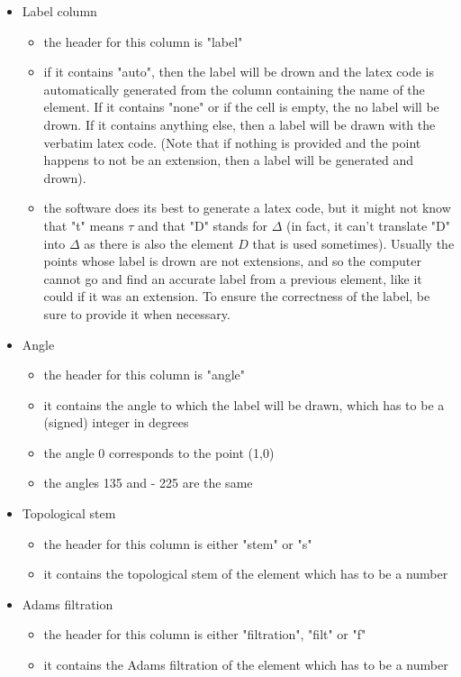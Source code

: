 \documentclass[a4paper,11pt]{article}
\begin{document}
\begin{itemize}
	\item{Label column}
	\begin{itemize}
		\item the header for this column is "label"
		\item if it contains "auto", then the label will be drown and the latex code is automatically generated from the column containing the name of the element. If it contains "none" or if the cell is empty, the no label will be drown. If it contains anything else, then a label will be drawn with the verbatim latex code. (Note that if nothing is provided and the point happens to not be an extension, then a label will be generated and drown).
		\item the software does its best to generate a latex code, but it might not know that "t" means $\tau$ and that "D" stands for $\Delta$ (in fact, it can't translate "D" into $\Delta$ as there is also the element $D$ that is used sometimes). Usually the points whose label is drown are not extensions, and so the computer cannot go and find an accurate label from a previous element, like it could if it was an extension. To ensure the correctness of the label, be sure to provide it when necessary. 
	\end{itemize}
	
	\item{Angle}
	\begin{itemize}
		\item the header for this column is "angle"
		\item it contains the angle to which the label will be drawn, which has to be a (signed) integer in degrees
		\item the angle 0 corresponds to the point (1,0)
		\item the angles 135 and - 225 are the same
	\end{itemize}
	
	\item{Topological stem}
	\begin{itemize}
		\item the header for this column is either "stem" or "s"
		\item it contains the topological stem of the element which has to be a number
	\end{itemize}
	
	\item{Adams filtration}
	\begin{itemize}
		\item the header for this column is either "filtration", "filt" or "f"
		\item it contains the Adams filtration of the element which has to be a number
	\end{itemize}
	

\end{itemize}
\end{document}
